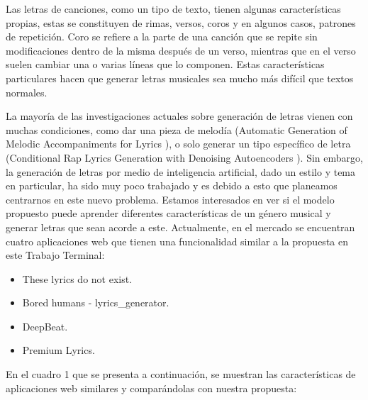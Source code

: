 \documentclass[12pt, a4paper, titlepage]{report}
\begin{document}
    Las letras de canciones, como un tipo de texto, tienen algunas características propias, estas se constituyen de rimas, versos, coros y en algunos casos, patrones de repetición. Coro se refiere a la parte de una canción que se repite sin modificaciones dentro de la misma después de un verso, mientras que en el verso suelen cambiar una o varias líneas que lo componen. Estas características particulares hacen que generar letras musicales sea mucho más difícil que textos normales.\par
    
    La mayoría de las investigaciones actuales sobre generación de letras vienen con muchas condiciones, como dar una pieza de melodía (Automatic Generation of Melodic Accompaniments for Lyrics \cite{Automatic_Generation_of_Melodic_Accompaniments_for_Lyrics}), o solo generar un tipo específico de letra (Conditional Rap Lyrics Generation with Denoising Autoencoders \cite{Conditional_Rap_Lyrics_Generation}). Sin embargo, la generación de letras por medio de inteligencia artificial, dado un estilo y tema en particular, ha sido muy poco trabajado y es debido a esto que planeamos centrarnos en este nuevo problema. Estamos interesados en ver si el modelo propuesto puede aprender diferentes características de un género musical y generar letras que sean acorde a este. Actualmente, en el mercado se encuentran cuatro aplicaciones web que tienen una funcionalidad similar a la propuesta en este Trabajo Terminal:\par
    
    \begin{itemize}
    	\item These lyrics do not exist.
    	\item Bored humans - lyrics\_generator.
    	\item DeepBeat.
    	\item Premium Lyrics.
    \end{itemize}
\newpage
	En el cuadro 1 que se presenta a continuación, se muestran las características de aplicaciones web similares y comparándolas con nuestra propuesta:
\end{document}
